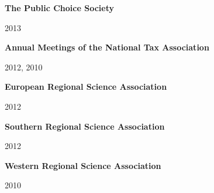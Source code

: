 \documentclass[10pt]{article}
\begin{document}
\begin{outerlist}
\item[] \textbf{The Public Choice Society}
    \begin{innerlist}
    \item[] 2013
    \end{innerlist}
\item[] \textbf{Annual Meetings of the National Tax Association}
    \begin{innerlist}
    \item[] 2012, 2010
    \end{innerlist}
\item[] \textbf{European Regional Science Association}
    \begin{innerlist}
    \item[] 2012
    \end{innerlist}
\item[] \textbf{Southern Regional Science Association}
    \begin{innerlist}
    \item[] 2012
    \end{innerlist}
\item[] \textbf{Western Regional Science Association}
    \begin{innerlist}
    \item[] 2010
    \end{innerlist}
\end{outerlist}
\end{document}
